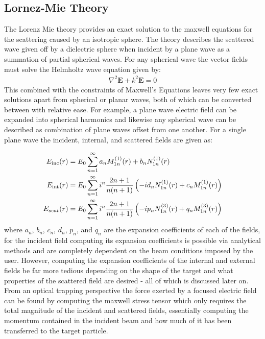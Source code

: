 \subsection{Lornez-Mie Theory}

The Lorenz Mie theory provides an exact solution to the maxwell equations for the scattering caused by an isotropic sphere. The theory describes the scattered wave given off by a dielectric sphere when incident by a plane wave as a summation of partial spherical waves. For any spherical wave the vector fields must solve the Helmholtz wave equation given by:
\begin{align}
	\nabla^2\mathbf{E} +k^2\mathbf{E} = 0
\end{align} 
This combined with the constraints of Maxwell's Equations leaves very few exact solutions apart from spherical or planar waves, both of which can be converted between with relative ease. For example, a plane wave electric field can be expanded into spherical harmonics and likewise any spherical wave can be described as combination of plane waves offset from one another. For a single plane wave the incident, internal, and scattered fields are given as:

\begin{align}
  E_{\rm inc}(r)
  &=
    E_0 \sum_{n=1}^\infty a_{n}M_{1n}^{(1)}(r)+b_{n}N_{1n}^{(1)}(r)
  \\
  E_{\rm int}(r)
  &=
    E_0 \sum_{n=1}^\infty i^n\frac{2n+1}{n(n+1)}\left(-id_{n}N_{1n}^{(1)}(r)+c_{n}M_{1n}^{(1)}(r)\right)
  \\
  E_{scat}(r)
  &=
    E_0 \sum_{n=1}^\infty  i^n\frac{2n+1}{n(n+1)}\left(-ip_{n}N_{1n}^{(3)}(r)+q_{n}M_{1n}^{(3)}(r)\right)
\end{align}
where $a_n$, $b_n$, $c_n$, $d_n$, $p_n$, and $q_n$ are the expansion coefficients of each of the fields, for the incident field computing its expansion coefficients is possible via analytical methods and are completely dependent on the beam conditions imposed by the user. However, computing the expansion coefficients of the internal and external fields be far more tedious depending on the shape of the target and what properties of the scattered field are desired - all of which is discussed later on. From an optical trapping perspective the force exerted by a focused electric field can be found by computing the maxwell stress tensor which only requires the total magnitude of the incident and scattered fields, essentially computing the momentum contained in the incident beam and how much of it has been transferred to the target particle. 

